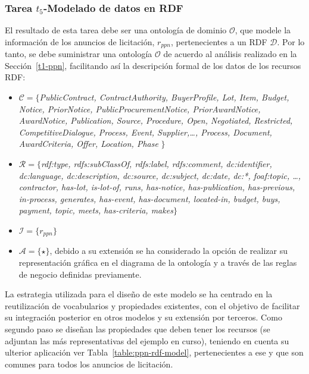 \subsubsection{Tarea $t_5$-Modelado de datos en RDF}
El resultado de esta tarea debe ser una ontología de dominio $\mathcal{O}$, que modele la información 
de los anuncios de licitación, $r_{ppn}$, pertenecientes a un \dataset RDF $\mathcal{D}$. Por lo tanto, se debe 
suministrar una ontología $\mathcal{O}$ de acuerdo al análisis realizado en la Sección~\ref{t1-ppn}, facilitando 
así la descripción formal de los datos de los recursos \gls{RDF}:
% 
 \begin{itemize}
  \item $\mathcal{C} = \{$\textit{PublicContract, ContractAuthority, BuyerProfile, Lot, Item, Budget, Notice, PriorNotice, PublicProcurementNotice, PriorAwardNotice, AwardNotice, Publication, Source, Procedure, Open, Negotiated, Restricted, CompetitiveDialogue, Process, 
Event, Supplier,\ldots, Process, Document, AwardCriteria, Offer, Location, Phase }$\}$
  \item $\mathcal{R} = \{$\textit{rdf:type, rdfs:subClassOf, rdfs:label, rdfs:comment, dc:identifier, dc:language, dc:description, dc:source, dc:subject, dc:date, dc:*, foaf:topic, 
\ldots, contractor, has-lot, is-lot-of, runs, has-notice, has-publication, has-previous, in-process, 
generates, has-event, has-document, located-in, budget, buys, payment, topic, meets, has-criteria, makes}$\}$
  \item $\mathcal{I} = \{ r_{ppn} \}$
  \item $\mathcal{A} = \{\star\}$, debido a su extensión se ha considerado la opción de realizar su representación 
gráfica en el diagrama de la ontología y a través de las reglas de negocio definidas previamente.
 \end{itemize}
%  
La estrategia utilizada para el diseño de este modelo se ha centrado en la reutilización de vocabularios y propiedades 
existentes, con el objetivo de facilitar su integración posterior en otros modelos y su extensión por terceros. Como segundo paso 
se diseñan las propiedades que deben tener los recursos (se adjuntan las más representativas del ejemplo en curso), teniendo en cuenta su ulterior aplicación ver 
Tabla~\ref{table:ppn-rdf-model},  pertenecientes a ese \dataset y que son comunes para todos los anuncios de licitación.
% 
